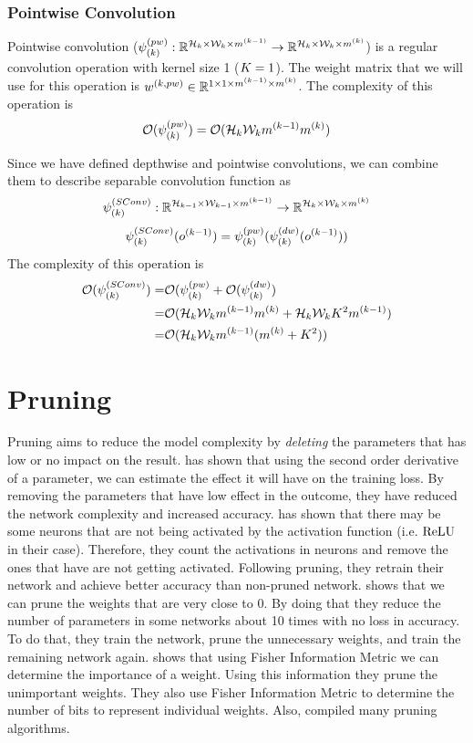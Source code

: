 \subsubsection{Pointwise Convolution}
Pointwise convolution ($\psi_{(k)}^{(pw)} : \mathbb{R}^{\mathcal{H}_{k} \times \mathcal{W}_{k} \times m^{(k-1)}} \rightarrow \mathbb{R}^{\mathcal{H}_{k} \times \mathcal{W}_{k} \times m^{(k)}}$) is a regular convolution operation with kernel size 1 ($K = 1$). The weight matrix that we will use for this operation is $w^{(k, pw)} \in \mathbb{R}^{ 1 \times 1 \times m^{(k-1)} \times m^{(k)}}$. The complexity of this operation is
$$ \mathcal{O}(\psi_{(k)}^{(pw)}) = \mathcal{O}( \mathcal{H}_{k}\mathcal{W}_{k}m^{(k-1)}m^{(k)})$$

Since we have defined depthwise and pointwise convolutions, we can combine them to describe separable convolution function as
$$\psi^{(SConv)}_{(k)} : \mathbb{R}^{\mathcal{H}_{k-1} \times \mathcal{W}_{k-1} \times m^{(k-1)}} \rightarrow \mathbb{R}^{\mathcal{H}_{k} \times \mathcal{W}_{k} \times m^{(k)}}$$
$$ \psi^{(SConv)}_{(k)}(o^{(k-1)}) = \psi^{(pw)}_{(k)} ( \psi^{(dw)}_{(k)}(o^{(k-1)}) ) $$
The complexity of this operation is
\begin{equation*}
\begin{split}
\mathcal{O}(\psi^{(SConv)}_{(k)}) =& \mathcal{O}(\psi^{(pw)}_{(k)} + \mathcal{O} (\psi^{(dw)}_{(k)}) \\
=& \mathcal{O}(\mathcal{H}_{k}\mathcal{W}_{k}m^{(k-1)}m^{(k)} + \mathcal{H}_{k}\mathcal{W}_{k}K^2m^{(k-1)}) \\
=& \mathcal{O}(\mathcal{H}_{k}\mathcal{W}_{k}m^{(k-1)}(m^{(k)} + K^2))
\end{split}
 \end{equation*}

\section{Pruning}

Pruning aims to reduce the model complexity by \textit{deleting} the parameters that has low or no impact on the result. \cite{lecun1989optimal} has shown that using the second order derivative of a parameter, we can estimate the effect it will have on the training loss. By removing the parameters that have low effect in the outcome, they have reduced the network complexity and increased accuracy. \cite{Hu:2016aa} has shown that there may be some neurons that are not being activated by the activation function (i.e. $\textrm{ReLU}$ in their case). Therefore, they count the activations in neurons and remove the ones that have are not getting activated. Following pruning, they retrain their network and achieve better accuracy than non-pruned network. \cite{han2015learning} shows that we can prune the weights that are very close to 0. By doing that they reduce the number of parameters in some networks about 10 times with no loss in accuracy. To do that, they train the network, prune the unnecessary weights, and train the remaining network again.  \cite{tu2016reducing} shows that using Fisher Information Metric we can determine the importance of a weight. Using this information they prune the unimportant weights. They also use Fisher Information Metric to determine the number of bits to represent individual weights. Also, \cite{reed1993pruning} compiled many pruning algorithms.

